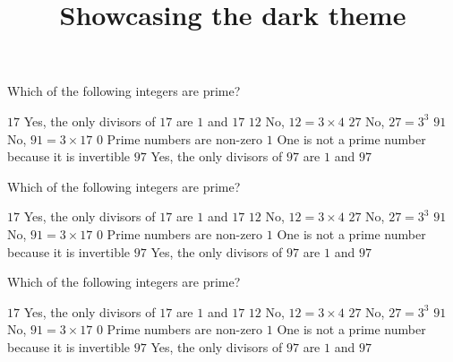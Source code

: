 \documentclass[theme=dark]{webquiz}
\title{Showcasing the dark theme}
\begin{document}
  \begin{question}     %
     Which of the following integers are prime?
     \begin{choice}[multiple, columns=3]
       \correct   $17$ \feedback Yes, the only divisors of $17$ are $1$ and $17$
       \incorrect $12$ \feedback No, $12 = 3\times 4$
       \incorrect $27$ \feedback No, $27=3^3$
       \incorrect $91$ \feedback No, $91 = 3\times 17$
       \incorrect  $0$ \feedback Prime numbers are non-zero
       \incorrect  $1$ \feedback One is not a prime number because it is invertible
       \correct   $97$ \feedback Yes, the only divisors of $97$ are $1$ and $97$
     \end{choice}
  \end{question}

  \begin{question}     %
     Which of the following integers are prime?
     \begin{choice}[multiple, columns=3]
       \correct   $17$ \feedback Yes, the only divisors of $17$ are $1$ and $17$
       \incorrect $12$ \feedback No, $12 = 3\times 4$
       \incorrect $27$ \feedback No, $27=3^3$
       \incorrect $91$ \feedback No, $91 = 3\times 17$
       \incorrect  $0$ \feedback Prime numbers are non-zero
       \incorrect  $1$ \feedback One is not a prime number because it is invertible
       \correct   $97$ \feedback Yes, the only divisors of $97$ are $1$ and $97$
     \end{choice}
  \end{question}

  \begin{question}     %
     Which of the following integers are prime?
     \begin{choice}[multiple, columns=3]
       \correct   $17$ \feedback Yes, the only divisors of $17$ are $1$ and $17$
       \incorrect $12$ \feedback No, $12 = 3\times 4$
       \incorrect $27$ \feedback No, $27=3^3$
       \incorrect $91$ \feedback No, $91 = 3\times 17$
       \incorrect  $0$ \feedback Prime numbers are non-zero
       \incorrect  $1$ \feedback One is not a prime number because it is invertible
       \correct   $97$ \feedback Yes, the only divisors of $97$ are $1$ and $97$
     \end{choice}
  \end{question}
\end{document}
